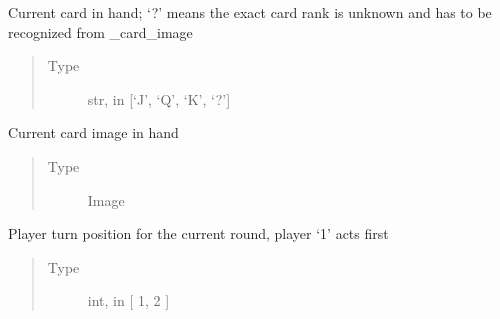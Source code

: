 \documentclass[letterpaper,10pt,english]{sphinxmanual}
\begin{document}
\begin{fulllineitems}
\begin{fulllineitems}
\end{fulllineitems}


\begin{fulllineitems}
\label{\detokenize{client:client.state.ClientGameRoundState._card}}
\pysigstartsignatures
{}
\pysigstopsignatures
\sphinxAtStartPar
Current card in hand; ‘?’ means the exact card rank is unknown and has to be recognized from \_card\_image
\begin{quote}\begin{description}
\item[{Type}] \leavevmode
\sphinxAtStartPar
str, in {[}‘J’, ‘Q’, ‘K’, ‘?’{]}

\end{description}\end{quote}

\end{fulllineitems}


\begin{fulllineitems}
\label{\detokenize{client:client.state.ClientGameRoundState._card_image}}
\pysigstartsignatures
{}
\pysigstopsignatures
\sphinxAtStartPar
Current card image in hand
\begin{quote}\begin{description}
\item[{Type}] \leavevmode
\sphinxAtStartPar
Image

\end{description}\end{quote}

\end{fulllineitems}


\begin{fulllineitems}
\label{\detokenize{client:client.state.ClientGameRoundState._turn_order}}
\pysigstartsignatures
{}
\pysigstopsignatures
\sphinxAtStartPar
Player turn position for the current round, player ‘1’ acts first
\begin{quote}\begin{description}
\item[{Type}] \leavevmode
\sphinxAtStartPar
int, in {[} 1, 2 {]}


\end{description}
\end{quote}
\end{fulllineitems}
\end{fulllineitems}
\end{document}
